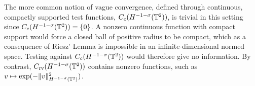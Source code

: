\begin{remark}
    The more common notion of vague convergence, defined through continuous, compactly supported test functions, $C_c(H^{-1-\sigma}(\mathbb{T}^2))$, is trivial in this setting since $C_c(H^{-1-\sigma}(\mathbb{T}^2))=\{0\}$. A nonzero continuous function with compact support would force a closed ball of positive radius to be compact, which as a consequence of Riesz' Lemma is impossible in an infinite-dimensional normed space. Testing against $C_c(H^{-1-\sigma}(\mathbb{T}^2))$ would therefore give no information.
    By contrast, $C_{\mathrm{rv}}(H^{-1-\sigma}(\mathbb{T}^2))$ contains nonzero functions, such as $v\mapsto\exp(-\|v\|_{H^{-1-\sigma}(\mathbb{T}^2)}^2)$.
\end{remark}